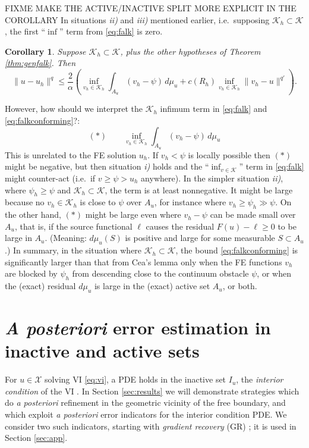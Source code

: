 \documentclass[]{interact}
\theoremstyle{plain}%
\newtheorem{corollary}[theorem]{Corollary}
\theoremstyle{definition}
\theoremstyle{remark}
\newcommand{\cK}{\mathcal{K}}
\newcommand{\cX}{\mathcal{X}}
\begin{document}
FIXME MAKE THE ACTIVE/INACTIVE SPLIT MORE EXPLICIT IN THE COROLLARY  In situations \emph{ii)} and \emph{iii)} mentioned earlier, i.e.~supposing $\cK_h\subset \cK$, the first ``$\inf$'' term from \eqref{eq:falk} is zero.

\begin{corollary} \label{cor:falkconforming}
Suppose $\cK_h\subset \cK$, plus the other hypotheses of Theorem \ref{thm:genfalk}.  Then
\begin{equation} \label{eq:falkconforming}
\|u-u_h\|^q \le \frac{2}{\alpha} \left(\inf_{v_h\in\cK_h} \int_{A_u} (v_h-\psi)\,d\mu_u + c(R_h) \inf_{v_h\in\cK_h} \|v_h - u\|^{q'}\right).
\end{equation}
\end{corollary}

However, how should we interpret the $\cK_h$ infimum term in \eqref{eq:falk} and \eqref{eq:falkconforming}?:
	$$(\ast) \qquad \inf_{v_h\in\cK_h} \int_{A_u} (v_h-\psi)\,d\mu_u$$
This is unrelated to the FE solution $u_h$.  If $v_h < \psi$ is locally possible then $(\ast)$ might be negative, but then situation \emph{i)} holds and the ``$\inf_{v\in\cK}$'' term in \eqref{eq:falk} might counter-act (i.e.~if $v\ge \psi > u_h$ anywhere).  In the simpler situation \emph{ii)}, where $\psi_h\ge \psi$ and $\cK_h\subset \cK$, the term is at least nonnegative.  It might be large because no $v_h\in\cK_h$ is close to $\psi$ over $A_u$, for instance where $v_h\ge \psi_h \gg \psi$.  On the other hand, $(\ast)$ might be large even where $v_h-\psi$ can be made small over $A_u$, that is, if the source functional $\ell$ causes the residual $F(u)-\ell\ge 0$ to be large in $A_u$.  (Meaning: $d\mu_u(S)$ is positive and large for some measurable $S\subset A_u$.)  In summary, in the situation where $\cK_h\subset \cK$, the bound \eqref{eq:falkconforming} is significantly larger than that from Cea's lemma only when the FE functions $v_h$ are blocked by $\psi_h$ from descending close to the continuum obstacle $\psi$, or when the (exact) residual $d\mu_u$ is large in the (exact) active set $A_u$, or both.


\section{\emph{A posteriori} error estimation in inactive and active sets} \label{sec:aposteriori}

For $u\in\cX$ solving VI \eqref{eq:vi}, a PDE holds in the inactive set $I_u$, the \emph{interior condition} of the VI \cite{KinderlehrerStampacchia1980}.  In Section \ref{sec:results} we will demonstrate strategies which do \emph{a posteriori} refinement in the geometric vicinity of the free boundary, and which exploit \emph{a posteriori} error indicators for the interior condition PDE.  We consider two such indicators, starting with \emph{gradient recovery} (GR) \cite[Chapter 4]{AinsworthOden2000}; it is used in Section \ref{sec:app}.
\end{document}
